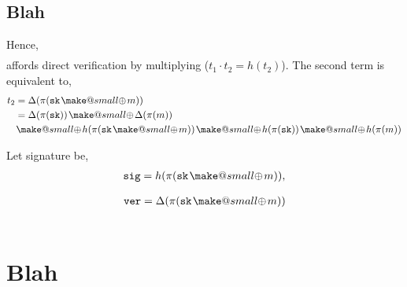 \documentclass[twocolumn, aps, amsmath, amssymb, nofootinbib, superscriptaddress, longbibliography, doublefloatfix, table-of-contents, eqsecnum, rmp]{revtex4-2}
\makeatletter
\newcommand{\soplus}{{{\hspace{1pt}}{\mathbin{\mathpalette\make@small\oplus}}}{\hspace{1pt}}}
\newcommand{\make@small}[2]{%
  \vcenter{\hbox{%
    \scalebox{0.6}{$\m@th#1#2$}%
  }}%
}
\makeatother
\begin{document}




\subsection{Blah}

Hence,
\begin{align}
	[h(\pi(\mathtt{sk} \soplus m)), \Delta(\pi(\mathtt{sk} \soplus m))]
\end{align}
affords direct verification by multiplying ($t_1\cdot t_2 = h(t_2)$). The second term is equivalent to,
\begin{align}
	t_2 &= \Delta(\pi(\mathtt{sk} \soplus m)) \nonumber\\
	&= \Delta(\pi(\mathtt{sk})) \soplus \Delta(\pi(m)) \nonumber\\
	&\soplus h(\pi(\mathtt{sk} \soplus m))
 \soplus h(\pi(\mathtt{sk})) \soplus h(\pi(m))
\end{align}


Let signature be,
\begin{align}
	\mathtt{sig} &= h(\pi(\mathtt{sk} \soplus m)),\nonumber\\
\end{align}

\begin{align}
	\mathtt{ver} &= \Delta(\pi(\mathtt{sk} \soplus m)) \nonumber\\
\end{align}

\begin{align}
	[\mathtt{sig}, \mathtt{ver}]
\end{align}


\section{Blah}
\end{document}

